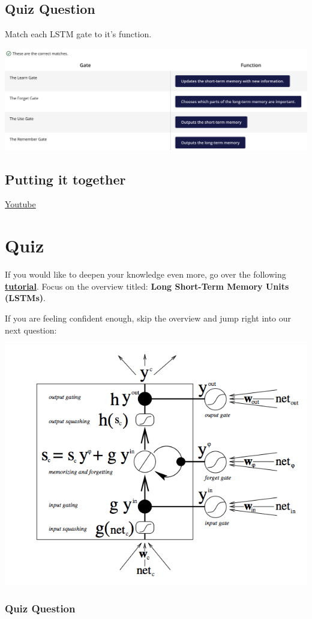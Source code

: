 \subsection{Quiz Question}

Match each LSTM gate to it's function.

\includegraphics[width=1\linewidth]{img//rnn//lstm/gates_quiz.png}

\subsection{Putting it together}
\href{https://www.youtube.com/watch?v=IF8FlKW-Zo0&ab_channel=Udacity}{Youtube}

\section{Quiz}
If you would like to deepen your knowledge even more, go over the following \href{https://web.archive.org/web/20190106151528/https://skymind.ai/wiki/lstm}{\textbf{tutorial}}. Focus on the overview titled: \textbf{Long Short-Term Memory Units (LSTMs)}. \newline

If you are feeling confident enough, skip the overview and jump right into our next question:

\includegraphics[width=0.5\linewidth]{img//rnn//lstm/screen-shot-2017-11-16-at-5.54.40-pm.png}


\subsubsection{Quiz Question}

